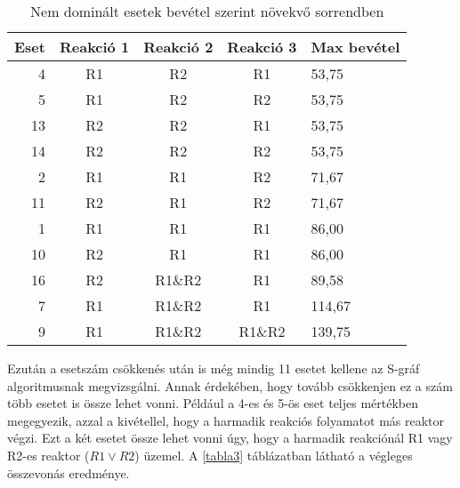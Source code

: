 	

\begin{table}[H]
	\begin{center}
		\caption{Nem dominált esetek bevétel szerint növekvő sorrendben}
		\captionsetup[table]{skip=10pt}	
		\label{tabla2}	
		\begin{tabular}{r|ccc|l}
		Eset & Reakció 1 & Reakció 2 & Reakció 3 & Max bevétel  \\ 
		\hline
		4    & R1        & R2        & R1        & 53,75        \\
		5    & R1        & R2        & R2        & 53,75        \\
		13   & R2        & R2        & R1        & 53,75        \\
		14   & R2        & R2        & R2        & 53,75        \\
		2    & R1        & R1        & R2        & 71,67        \\
		11   & R2        & R1        & R2        & 71,67        \\
		1    & R1        & R1        & R1        & 86,00        \\
		10   & R2        & R1        & R1        & 86,00        \\
		16   & R2        & R1\&R2    & R1        & 89,58        \\
		7    & R1        & R1\&R2    & R1        & 114,67       \\
		9    & R1        & R1\&R2    & R1\&R2    & 139,75      
		\end{tabular}
	\end{center}
\end{table}

Ezután a esetszám csökkenés után is még mindig 11 esetet kellene az S-gráf algoritmusnak megvizsgálni. Annak érdekében, hogy tovább csökkenjen ez a szám több esetet is össze lehet vonni. Például a 4-es és 5-ös eset teljes mértékben megegyezik, azzal a kivétellel, hogy a harmadik reakciós folyamatot más reaktor végzi. Ezt a két esetet össze lehet vonni úgy, hogy a harmadik reakciónál R1 vagy R2-es reaktor ($R1 \vee R2$) üzemel. A \ref{tabla3} táblázatban látható a végleges összevonás eredménye.

